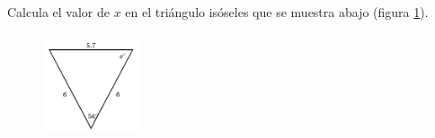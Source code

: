 \question[15]  Calcula el valor de $x$ en el triángulo isóseles  que se muestra abajo (figura \ref{fig:findangle09}).
\begin{figure}[H]
    \begin{center}
        \includegraphics[width=0.25\textwidth]{../images/findangle09.png}
    \end{center}
    \caption{}
    \label{fig:findangle09}
\end{figure}